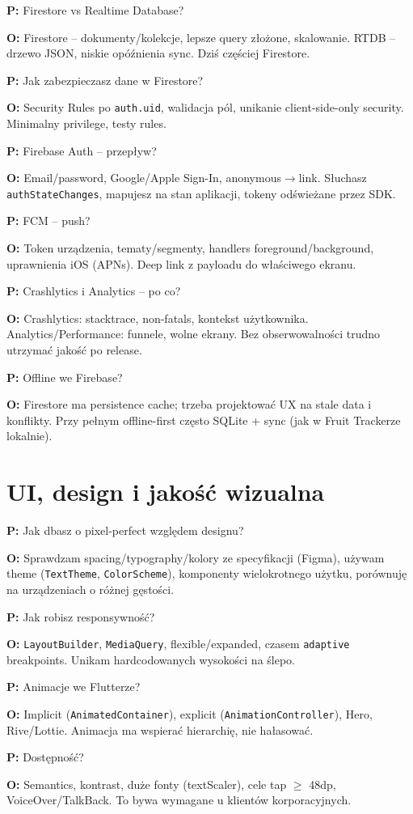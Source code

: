 \documentclass[11pt,a4paper]{article}
\newcommand{\pyt}[1]{\par\medskip\noindent\textbf{P:} #1\par}
\newcommand{\odp}[1]{\noindent\textbf{O:} #1\par}
\begin{document}
\pyt{Firestore vs Realtime Database?}
\odp{Firestore -- dokumenty/kolekcje, lepsze query złożone, skalowanie. RTDB -- drzewo JSON, niskie opóźnienia sync. Dziś częściej Firestore.}

\pyt{Jak zabezpieczasz dane w Firestore?}
\odp{Security Rules po \texttt{auth.uid}, walidacja pól, unikanie client-side-only security. Minimalny privilege, testy rules.}

\pyt{Firebase Auth -- przepływ?}
\odp{Email/password, Google/Apple Sign-In, anonymous$\to$link. Słuchasz \texttt{authStateChanges}, mapujesz na stan aplikacji, tokeny odświeżane przez SDK.}

\pyt{FCM -- push?}
\odp{Token urządzenia, tematy/segmenty, handlers foreground/background, uprawnienia iOS (APNs). Deep link z payloadu do właściwego ekranu.}

\pyt{Crashlytics i Analytics -- po co?}
\odp{Crashlytics: stacktrace, non-fatals, kontekst użytkownika. Analytics/Performance: funnele, wolne ekrany. Bez obserwowalności trudno utrzymać jakość po release.}

\pyt{Offline we Firebase?}
\odp{Firestore ma persistence cache; trzeba projektować UX na stale data i konflikty. Przy pełnym offline-first często SQLite + sync (jak w Fruit Trackerze lokalnie).}

\section{UI, design i jakość wizualna}

\pyt{Jak dbasz o pixel-perfect względem designu?}
\odp{Sprawdzam spacing/typography/kolory ze specyfikacji (Figma), używam theme (\texttt{TextTheme}, \texttt{ColorScheme}), komponenty wielokrotnego użytku, porównuję na urządzeniach o różnej gęstości.}

\pyt{Jak robisz responsywność?}
\odp{\texttt{LayoutBuilder}, \texttt{MediaQuery}, flexible/expanded, czasem \texttt{adaptive} breakpoints. Unikam hardcodowanych wysokości na ślepo.}

\pyt{Animacje we Flutterze?}
\odp{Implicit (\texttt{AnimatedContainer}), explicit (\texttt{AnimationController}), Hero, Rive/Lottie. Animacja ma wspierać hierarchię, nie hałasować.}

\pyt{Dostępność?}
\odp{Semantics, kontrast, duże fonty (textScaler), cele tap $\ge$ 48dp, VoiceOver/TalkBack. To bywa wymagane u klientów korporacyjnych.}
\end{document}
